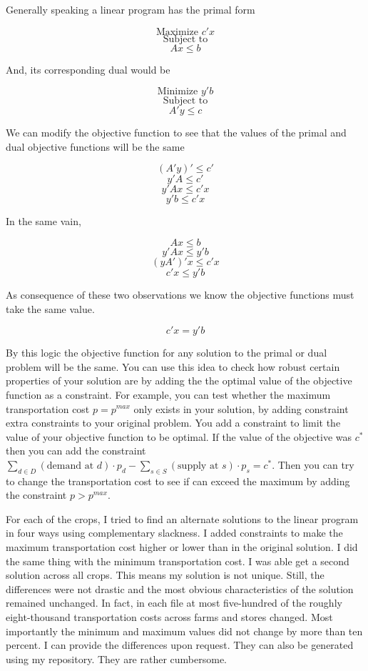 \documentclass{report}
\begin{document}
Generally speaking a linear program has the primal form

$$\text{Maximize } c' x$$
$$\text{Subject to}$$
$$Ax \leq b$$

And, its corresponding dual would be

$$\text{Minimize } y' b$$
$$\text{Subject to}$$
$$A'y \leq c$$

We can modify the objective function to see that the values of the primal and dual objective functions will be the same

$$(A'y)' \leq c'$$
$$ y'A \leq c'$$
$$ y'Ax \leq c'x$$
$$y' b \leq c'x$$

In the same vain, 

$$ Ax \leq b$$
$$ y'Ax \leq y'b$$
$$ (yA')'x \leq c'x$$
$$ c'x \leq  y' b $$

As consequence of these two observations we know the objective functions must take the same value.

$$c'x = y' b$$

By this logic the objective function for any solution to the primal or dual problem will be the same. You can use this idea to check how robust certain properties of your solution are by adding the the optimal value of the objective function as a constraint. For example, you can test whether the maximum transportation cost $p = p^{max}$ only exists in your solution, by adding constraint extra constraints to your original problem. You add a constraint to limit the value of your objective function to be optimal. If the value of the objective was $c^*$ then you can add the constraint  $ \sum_{d \in D}  (\text{demand at } d) \cdot p_{d} -   \sum_{s \in S}  (\text{supply at } s) \cdot p_{s} = c^*$. Then you can try to change the transportation cost to see if can exceed the maximum by adding the constraint $p > p^{max}$.

For each of the crops, I tried to find an alternate solutions to the linear program in four ways using complementary slackness. I added constraints to make the maximum transportation cost higher or lower than in the original solution. I did the same thing with the minimum transportation cost. I was able get a second solution across all crops. This means my solution is not unique. Still, the differences were not drastic and the most obvious characteristics of the solution remained unchanged. In fact, in each file at most five-hundred of the roughly eight-thousand transportation costs across farms and stores changed. Most importantly the minimum and maximum values did not change by more than ten percent. I can provide the differences upon request. They can also be generated using my repository. They are rather cumbersome.
\end{document}
